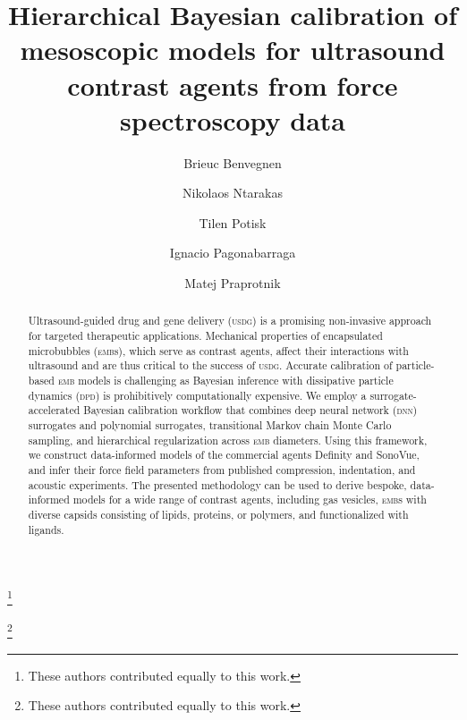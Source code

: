 \documentclass[%
 aip,
 jcp,
 amsmath,amssymb,
 preprint,%
]{revtex4-1}
\begin{document}
\title{Hierarchical Bayesian calibration of mesoscopic models for ultrasound contrast agents from force spectroscopy data}

\author{Brieuc Benvegnen}
\thanks{These authors contributed equally to this work.}

\author{Nikolaos Ntarakas}
\thanks{These authors contributed equally to this work.}

\author{Tilen Potisk}

\author{Ignacio Pagonabarraga}

\author{Matej Praprotnik}

\begin{abstract}
Ultrasound-guided drug and gene delivery (\textsc{usdg}) is a promising non-invasive approach for targeted therapeutic applications. Mechanical properties of encapsulated microbubbles (\textsc{emb}s), which serve as contrast agents, affect their interactions with ultrasound and are thus critical to the success of \textsc{usdg}. Accurate calibration of particle-based \textsc{emb} models is challenging as Bayesian inference with dissipative particle dynamics (\textsc{dpd}) is prohibitively computationally expensive. We employ a surrogate-accelerated Bayesian calibration workflow that combines deep neural network (\textsc{dnn}) surrogates and polynomial surrogates, transitional Markov chain Monte Carlo sampling, and hierarchical regularization across \textsc{emb} diameters. Using this framework, we construct data-informed models of the commercial agents Definity and SonoVue, and infer their force field parameters from published compression, indentation, and acoustic experiments. The presented methodology can be used to derive bespoke, data-informed models for a wide range of contrast agents, including gas vesicles, \textsc{emb}s with diverse capsids consisting of lipids, proteins, or polymers, and functionalized with ligands.
\end{abstract}
\end{document}
